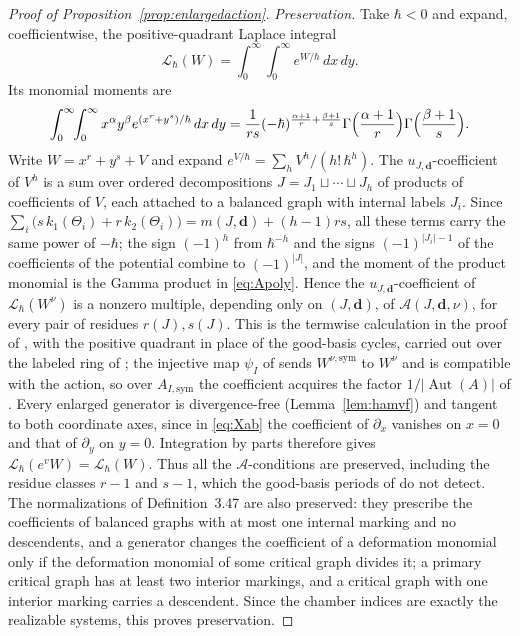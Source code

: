 \documentclass[11pt]{amsart}
\theoremstyle{definition}
\theoremstyle{remark}
\DeclareMathOperator{\Aut}{Aut}
\begin{document}
\begin{proof}[Proof of Proposition~\ref{prop:enlargedaction}]
\emph{Preservation.}  Take $\hbar<0$ and expand, coefficientwise, the
positive-quadrant Laplace integral
\[
 \mathcal L_\hbar(W)=\int_0^\infty\!\int_0^\infty e^{W/\hbar}\,dx\,dy.
\]
Its monomial moments are
\[
 \int_0^\infty\!\!\int_0^\infty x^{\alpha}y^{\beta}
 e^{(x^r+y^s)/\hbar}\,dx\,dy
 =\frac1{rs}(-\hbar)^{\frac{\alpha+1}r+\frac{\beta+1}s}
 \Gamma\Bigl(\frac{\alpha+1}r\Bigr)\Gamma\Bigl(\frac{\beta+1}s\Bigr).
\]
Write $W=x^r+y^s+V$ and expand $e^{V/\hbar}=\sum_h V^h/(h!\,\hbar^h)$.  The
$u_{J,\mathbf d}$-coefficient of $V^h$ is a sum over ordered decompositions
$J=J_1\sqcup\cdots\sqcup J_h$ of products of coefficients of $V$, each
attached to a balanced graph with internal labels $J_i$.  Since
$\sum_i\bigl(s\,k_1(\Theta_i)+r\,k_2(\Theta_i)\bigr)=m(J,\mathbf d)+(h-1)rs$, all
these terms carry the same power of $-\hbar$; the sign $(-1)^h$ from
$\hbar^{-h}$ and the signs $(-1)^{|J_i|-1}$ of the coefficients of the
potential combine to $(-1)^{|J|}$, and the moment of the product monomial is
the Gamma product in \eqref{eq:Apoly}.  Hence the $u_{J,\mathbf d}$-coefficient
of $\mathcal L_\hbar(W^\nu)$ is a nonzero multiple, depending only on
$(J,\mathbf d)$, of $\mathcal A(J,\mathbf d,\nu)$, for every pair of residues
$r(J),s(J)$.  This is the termwise calculation in the proof of
\cite[Theorem~4.9]{GKT}, with the positive quadrant in place of the
good-basis cycles, carried out over the labeled ring of
\cite[Definition~4.6]{GKT}; the injective map $\psi_I$ of
\cite[Lemma~4.14]{GKT} sends $W^{\nu,\mathrm{sym}}$ to $W^\nu$
\cite[Corollary~4.15]{GKT} and is compatible with the action, so over
$A_{I,\mathrm{sym}}$ the coefficient acquires the factor $1/|\Aut(A)|$ of
\cite[(4.11)]{GKT}.  Every enlarged generator
is divergence-free (Lemma~\ref{lem:hamvf}) and tangent to both coordinate
axes, since in \eqref{eq:Xab} the coefficient of $\partial_x$ vanishes on
$x=0$ and that of $\partial_y$ on $y=0$.  Integration by parts therefore gives
$\mathcal L_\hbar(e^vW)=\mathcal L_\hbar(W)$.  Thus all the
$\mathcal A$-conditions are preserved, including the residue classes $r-1$
and $s-1$, which the good-basis periods of \cite[\S4.1]{GKT} do not detect.
The normalizations of Definition~3.47 are also preserved: they prescribe the
coefficients of balanced graphs with at most one internal marking and no
descendents, and a generator changes the coefficient of a deformation
monomial only if the deformation monomial of some critical graph divides
it; a
primary critical graph has at least two interior markings, and a critical
graph with one interior marking carries a descendent.  Since the chamber indices are exactly the realizable
systems, this proves preservation.


\end{proof}
\end{document}

